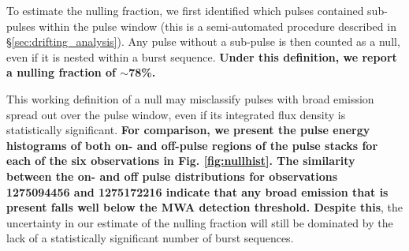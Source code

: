 \documentclass[linenumbers]{aastex631}
\newcommand{\nullfraction}{78\%}
\begin{document}
To estimate the nulling fraction, we first identified which pulses contained sub-pulses within the pulse window (this is a semi-automated procedure described in \S\ref{sec:drifting_analysis}).
Any pulse without a sub-pulse is then counted as a null, even if it is nested within a burst sequence.
{\bf Under this definition, we report a nulling fraction of $\sim$\nullfraction{}.}

This working definition of a null may misclassify pulses with broad emission spread out over the pulse window, even if its integrated flux density is statistically significant.
{\bf For comparison, we present the pulse energy histograms of both on- and off-pulse regions of the pulse stacks for each of the six observations in Fig. \ref{fig:nullhist}.
The similarity between the on- and off pulse distributions for observations 1275094456 and 1275172216 indicate that any broad emission that is present falls well below the MWA detection threshold.
Despite this}, the uncertainty in our estimate of the nulling fraction will still be dominated by the lack of a statistically significant number of burst sequences.
\end{document}
